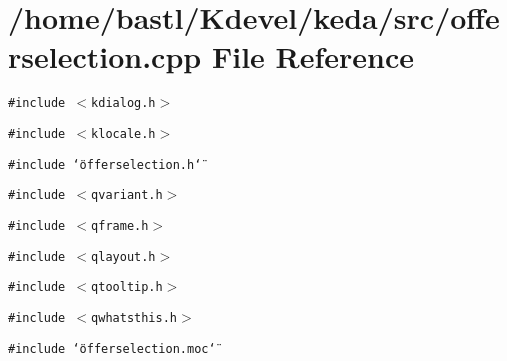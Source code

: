 \section{/home/bastl/Kdevel/keda/src/offerselection.cpp File Reference}
\label{offerselection_8cpp}
{\tt \#include $<$kdialog.h$>$}\par
{\tt \#include $<$klocale.h$>$}\par
{\tt \#include \char`\"{}offerselection.h\char`\"{}}\par
{\tt \#include $<$qvariant.h$>$}\par
{\tt \#include $<$qframe.h$>$}\par
{\tt \#include $<$qlayout.h$>$}\par
{\tt \#include $<$qtooltip.h$>$}\par
{\tt \#include $<$qwhatsthis.h$>$}\par
{\tt \#include \char`\"{}offerselection.moc\char`\"{}}\par
